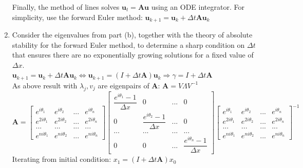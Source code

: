 \documentclass[14pt,a4paper]{article}
\begin{document}
\begin{enumerate}
	Finally, the method of lines solves $\textbf{u}_t = \textbf{Au}$ using an ODE integrator. For simplicity, use the forward Euler method: \hspace{2cm} $\textbf{u}_{k+1} = \textbf{u}_k + \Delta t\textbf{Au}_k$	
	\label{4c}
	\item Consider the eigenvalues from part (b), together with the theory of absolute stability for the forward Euler method, to determine a sharp condition on $\Delta t$ that ensures there are no exponentially growing solutions for a fixed value of $\Delta x$. \\%
	\hspace*{2cm} $\textbf{u}_{k+1} = \textbf{u}_k + \Delta t\textbf{Au}_k \Leftrightarrow \textbf{u}_{k+1} = (I + \Delta t\textbf{A})\textbf{u}_k  \Rightarrow \gamma = I + \Delta t\textbf{A} $\\	
	As above result with $\lambda_j, v_j$ are eigenpairs of \textbf{A}: $\textbf{A} = V\Lambda V^{-1}$ 	\\
	$ \textbf{A} = \begin{bmatrix} e^{i\theta_1} & e^{i\theta_2} & ... & e^{i\theta_n} \\ e^{2i\theta_1} & e^{2i\theta_2} & ... & e^{2i\theta_n} \\ ... & ... & ... & ... \\ e^{ni\theta_1} & e^{ni\theta_2} & ... & e^{ni\theta_n} \end{bmatrix} \begin{bmatrix} \dfrac{e^{i\theta_1}-1}{\Delta x} & 0 & ... & 0 \\ 0& \dfrac{e^{i\theta_2}-1}{\Delta x}& ... &0 \\ ... &...&...&... \\ 0&0&...&\dfrac{e^{i\theta_n}-1}{\Delta x} \end{bmatrix} \begin{bmatrix} e^{i\theta_1} & e^{i\theta_2} & ... & e^{i\theta_n} \\ e^{2i\theta_1} & e^{2i\theta_2} & ... & e^{2i\theta_n} \\ ... & ... & ... & ... \\ e^{ni\theta_1} & e^{ni\theta_2} & ... & e^{ni\theta_n} \end{bmatrix}^{-1}$\\
	Iterating from initial condition: $x_1 = (I + \Delta t\textbf{A})x_0$\\

\end{enumerate}
\end{document}
